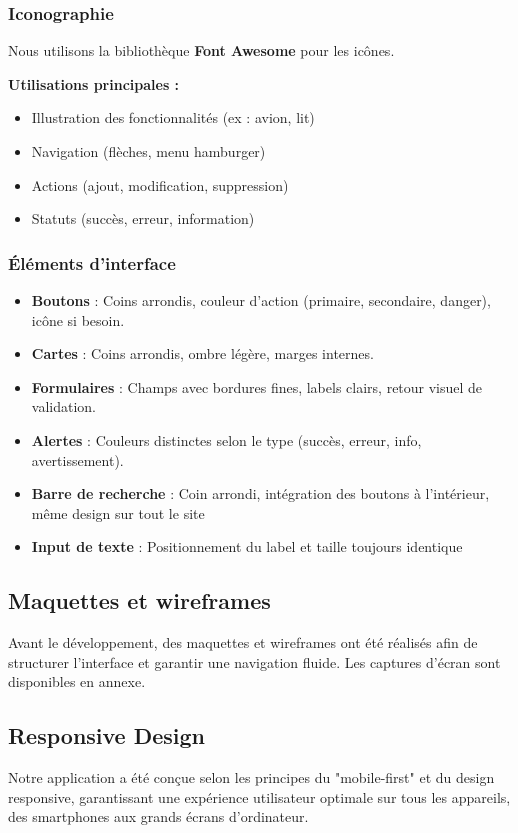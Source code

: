 \documentclass[a4paper,12pt]{article}
\begin{document}
\subsubsection{Iconographie}
Nous utilisons la bibliothèque \textbf{Font Awesome} pour les icônes.

\textbf{Utilisations principales :}
\begin{itemize}
  \item Illustration des fonctionnalités (ex : avion, lit)
  \item Navigation (flèches, menu hamburger)
  \item Actions (ajout, modification, suppression)
  \item Statuts (succès, erreur, information)
\end{itemize}

\subsubsection{Éléments d’interface}
\begin{itemize}
  \item \textbf{Boutons} : Coins arrondis, couleur d’action (primaire, secondaire, danger), icône si besoin.
  \item \textbf{Cartes} : Coins arrondis, ombre légère, marges internes.
  \item \textbf{Formulaires} : Champs avec bordures fines, labels clairs, retour visuel de validation.
  \item \textbf{Alertes} : Couleurs distinctes selon le type (succès, erreur, info, avertissement).
  \item \textbf{Barre de recherche} : Coin arrondi, intégration des boutons à l'intérieur, même design sur tout le site
  \item \textbf{Input de texte} : Positionnement du label et taille toujours identique
  
  \end{itemize}
  
 \subsection{Maquettes et wireframes}
 Avant le développement, des maquettes et wireframes ont été réalisés afin de structurer l’interface et garantir une navigation fluide. Les captures d'écran sont disponibles en annexe.
  

\subsection{Responsive Design}
Notre application a été conçue selon les principes du "mobile-first" et du design
responsive, garantissant une expérience utilisateur optimale sur tous les appareils, des
smartphones aux grands écrans d'ordinateur.
\end{document}
